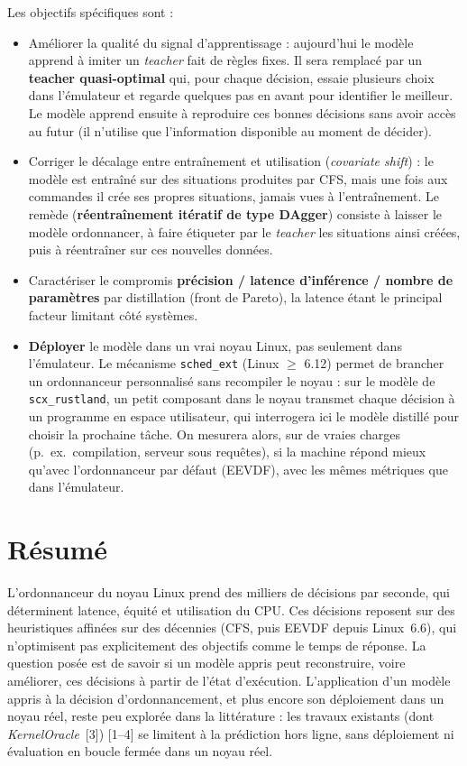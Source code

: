 \documentclass[11pt,a4paper]{article}
\begin{document}
\medskip
Les objectifs spécifiques sont :
\begin{itemize}[leftmargin=1.5em,itemsep=3pt]
  \item Améliorer la qualité du signal d'apprentissage : aujourd'hui le modèle
    apprend à imiter un \emph{teacher} fait de règles fixes. Il sera remplacé
    par un \textbf{teacher quasi-optimal} qui, pour chaque décision, essaie
    plusieurs choix dans l'émulateur et regarde quelques pas en avant pour
    identifier le meilleur. Le modèle apprend ensuite à reproduire ces bonnes
    décisions sans avoir accès au futur (il n'utilise que l'information
    disponible au moment de décider).
  \item Corriger le décalage entre entraînement et utilisation
    (\emph{covariate shift}) : le modèle est entraîné sur des situations
    produites par CFS, mais une fois aux commandes il crée ses propres
    situations, jamais vues à l'entraînement. Le remède (\textbf{réentraînement
    itératif de type DAgger}) consiste à laisser le modèle ordonnancer, à faire
    étiqueter par le \emph{teacher} les situations ainsi créées, puis à
    réentraîner sur ces nouvelles données.
  \item Caractériser le compromis \textbf{précision / latence d'inférence /
    nombre de paramètres} par distillation (front de Pareto), la latence étant
    le principal facteur limitant côté systèmes.
  \item \textbf{Déployer} le modèle dans un vrai noyau Linux, pas seulement
    dans l'émulateur. Le mécanisme \texttt{sched\_ext} (Linux $\geq$ 6.12)
    permet de brancher un ordonnanceur personnalisé sans recompiler le noyau :
    sur le modèle de \texttt{scx\_rustland}, un petit composant dans le noyau
    transmet chaque décision à un programme en espace utilisateur, qui
    interrogera ici le modèle distillé pour choisir la prochaine tâche. On
    mesurera alors, sur de vraies charges (p.~ex.\ compilation, serveur sous
    requêtes), si la machine répond mieux qu'avec l'ordonnanceur par défaut
    (EEVDF), avec les mêmes métriques que dans l'émulateur.
\end{itemize}

\section{Résumé}
L'ordonnanceur du noyau Linux prend des milliers de décisions par seconde, qui
déterminent latence, équité et utilisation du CPU. Ces décisions reposent sur des
heuristiques affinées sur des décennies (CFS, puis EEVDF depuis Linux~6.6), qui
n'optimisent pas explicitement des objectifs comme le temps de réponse. La
question posée est de savoir si un modèle appris peut reconstruire, voire
améliorer, ces décisions à partir de l'état d'exécution. L'application d'un
modèle appris à la décision d'ordonnancement, et plus encore son déploiement
dans un noyau réel, reste peu explorée dans la
littérature : les travaux existants (dont \textit{KernelOracle}~[3])
[1--4] se limitent à la prédiction hors ligne, sans déploiement ni
évaluation en boucle fermée dans un noyau réel.
\end{document}
